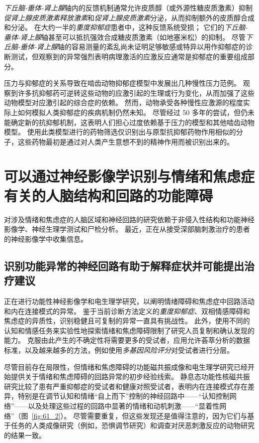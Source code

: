 \textit{下丘脑-垂体-肾上腺}轴内的反馈机制通常允许皮质醇（或外源性糖皮质激素）抑制\textit{促肾上腺皮质激素释放激素}和\textit{促肾上腺皮质激素}分泌，从而抑制额外的皮质醇合成和分泌。
在大约一半的\textit{重度抑郁症}患者中，这种反馈系统受损；
它们的\textit{下丘脑-垂体-肾上腺}轴甚至可以抵抗强效合成糖皮质激素（如地塞米松）的抑制。
尽管\textit{下丘脑-垂体-肾上腺}轴的容易测量的紊乱尚未证明足够敏感或特异以用作抑郁症的诊断测试，但观察到的异常强烈表明病理激活的应激反应通常是抑郁症的重要组成部分。


压力与抑郁症的关系导致在啮齿动物抑郁症模型中发展出几种慢性压力范例。
观察到许多抗抑郁药可逆转这些动物的应激引起的生理或行为变化，从而加强了这些动物模型对应激引起的综合症的依赖。
然而，动物承受各种慢性应激源的程度实际上如何模拟人类抑郁症的疾病机制仍然未知。
尽管经过 50 多年的尝试，但仍未能确定新的抗抑郁机制，这表明人们担心过度依赖基于压力的模型和其他啮齿动物模型。
使用此类模型进行的药物筛选仅识别出与原型抗抑郁药物作用相似的分子，这些药物最初是通过对人类产生意想不到的精神作用而被识别出来的。



\section{可以通过神经影像学识别与情绪和焦虑症有关的人脑结构和回路的功能障碍}

对涉及情绪和焦虑症的人脑区域和神经回路的研究依赖于非侵入性结构和功能神经影像学、神经生理学测试和尸检分析。
最近，正在从接受深部脑刺激治疗的患者的神经影像学中收集信息。



\subsection{识别功能异常的神经回路有助于解释症状并可能提出治疗建议}

正在进行功能性神经影像学和电生理学研究，以阐明情绪障碍和焦虑症中回路活动和内在连接模式的异常。
鉴于当前诊断方法定义的\textit{重度抑郁症}、双相情感障碍和焦虑症的异质性，识别稳健且可复制的异常一直具有挑战性。
此外，使用不同的认知和情感任务来实验性地探索情绪和焦虑障碍限制了研究人员复制和确认发现的能力。
克服由此产生的不确定性将需要更多的受试者，应用允许荟萃分析的数据标准，以及越来越多的方法，例如使用\textit{多基因风险评分}对受试者进行分层。


尽管目前存在局限性，但情绪和焦虑障碍的功能磁共振成像和电生理学研究已经开始提供关于情绪和焦虑障碍的回路异常的初步经验线索。
静息态功能性核磁共振研究比较了患有严重抑郁症的受试者和健康对照受试者，表明内在连接模式存在差异，特别是在调节认知和情绪“自上而下”控制的神经回路中——“认知控制网络”——以及处理这些过程的回路中显著的情绪和动机刺激——“显着性网络”（图~\ref{fig:61_2}）。
尽管需要重复，但这些发现还是值得注意的，因为它们与基于任务的人类成像研究（例如，恐惧调节研究）和调查对厌恶刺激反应的动物研究的结果一致。


